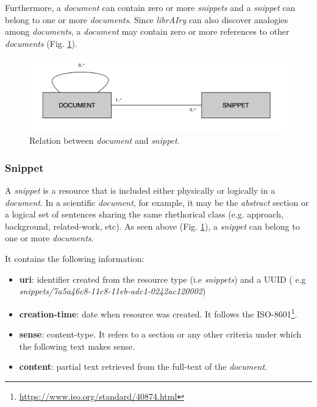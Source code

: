 Furthermore, a \textit{document} can contain zero or more \textit{snippets} and a \textit{snippet} can belong to one or more \textit{documents}. Since \textit{librAIry} can also discover analogies among \textit{documents}, a \textit{document} may contain zero or more references to other \textit{documents} (Fig. \ref{fig:librairy-model-document}).

\begin{figure}
  \center
  \includegraphics[scale=0.45]{model-document.png}
  \caption{Relation between \textit{document} and \textit{snippet}.}
  \label{fig:librairy-model-document}
\end{figure}

\subsubsection{Snippet}

A \textit{snippet} is a resource that is included either physically or logically in a \textit{document}. In a scientific \textit{document}, for example, it may be the \textit{abstract} section or a logical set of sentences sharing the same rhethorical class (e.g. approach, background, related-work, etc). As seen above (Fig. \ref{fig:librairy-model-document}), a \textit{snippet} can belong to one or more \textit{documents}.

It contains the following information:
\begin{itemize}
\item \textbf{uri}: identifier created from the resource type (i.e \textit{snippets}) and a UUID ( e.g \textit{snippets/7a5a46c8-11c8-11eb-adc1-0242ac120002})
\item \textbf{creation-time}: date when resource was created. It follows the ISO-8601\footnote{\url{https://www.iso.org/standard/40874.html}}.
\item \textbf{sense}: content-type. It refers to a section or any other criteria under which the following text makes sense.
\item \textbf{content}: partial text retrieved from the full-text of the \textit{document}.
\end{itemize}

